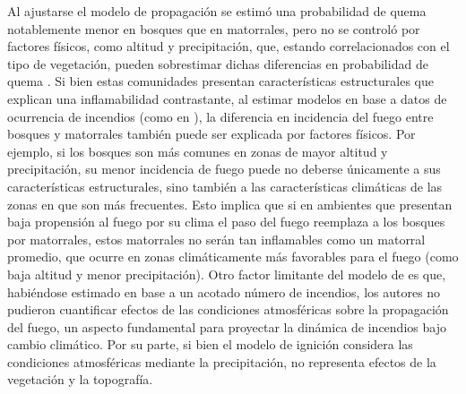 Al ajustarse el modelo de propagación se estimó una probabilidad de quema notablemente menor en bosques que en matorrales, pero no se controló por factores físicos, como altitud y precipitación, que, estando correlacionados con el tipo de vegetación, pueden sobrestimar dichas diferencias en probabilidad de quema \citep{morales_stochastic_2015}. Si bien estas comunidades presentan características estructurales que explican una inflamabilidad contrastante, al estimar modelos en base a datos de ocurrencia de incendios (como en \citealt{morales_stochastic_2015}), la diferencia en incidencia del fuego entre bosques y matorrales también puede ser explicada por factores físicos. Por ejemplo, si los bosques son más comunes en zonas de mayor altitud y precipitación, su menor incidencia de fuego puede no deberse únicamente a sus características estructurales, sino también a las características climáticas de las zonas en que son más frecuentes. Esto implica que si en ambientes que presentan baja propensión al fuego por su clima el paso del fuego reemplaza a los bosques por matorrales, estos matorrales no serán tan inflamables como un matorral promedio, que ocurre en zonas climáticamente más favorables para el fuego (como baja altitud y menor precipitación). Otro factor limitante del modelo de \citet{morales_stochastic_2015} es que, habiéndose estimado en base a un acotado número de incendios, los autores no pudieron cuantificar efectos de las condiciones atmosféricas sobre la propagación del fuego, un aspecto fundamental para proyectar la dinámica de incendios bajo cambio climático. Por su parte, si bien el modelo de ignición considera las condiciones atmosféricas mediante la precipitación, no representa efectos de la vegetación y la topografía. 


